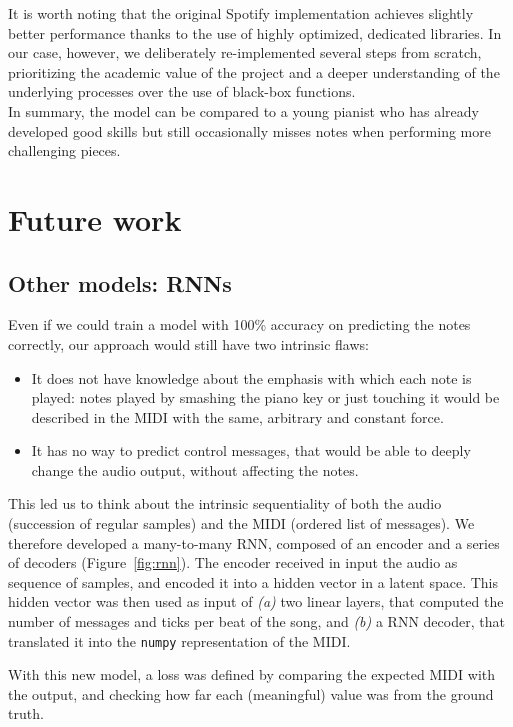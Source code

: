 \documentclass[10pt,twocolumn,letterpaper]{article}
\begin{document}
It is worth noting that the original Spotify implementation achieves slightly better performance thanks to the use of highly optimized, dedicated libraries. In our case, however, we deliberately re-implemented several steps from scratch, prioritizing the academic value of the project and a deeper understanding of the underlying processes over the use of black-box functions.\\

In summary, the model can be compared to a young pianist who has already developed good skills but still occasionally misses notes when performing more challenging pieces.


\section{Future work}\label{sec:future}

\subsection{Other models: RNNs}

Even if we could train a model with \num{100}\% accuracy on predicting the notes correctly, our approach would still have two intrinsic flaws:
\begin{itemize}
    \item It does not have knowledge about the emphasis with which each note is played: notes played by smashing the piano key or just touching it would be described in the MIDI with the same, arbitrary and constant force.
    \item It has no way to predict control messages, that would be able to deeply change the audio output, without affecting the notes.
\end{itemize}

This led us to think about the intrinsic sequentiality of both the audio (succession of regular samples) and the MIDI (ordered list of messages).
We therefore developed a many-to-many RNN, composed of an encoder and a series of decoders (Figure~\ref{fig:rnn}).
The encoder received in input the audio as sequence of samples, and encoded it into a hidden vector in a latent space.
This hidden vector was then used as input of \textit{(a)} two linear layers, that computed the number of messages and ticks per beat of the song, and \textit{(b)} a RNN decoder, that translated it into the \texttt{numpy} representation of the MIDI.

With this new model, a loss was defined by comparing the expected MIDI with the output, and checking how far each (meaningful) value was from the ground truth.
\end{document}
